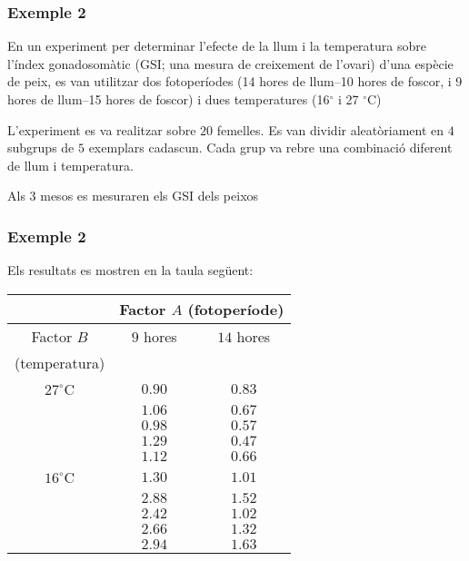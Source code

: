 \documentclass[12pt,t]{beamer}
\theoremstyle{plain}
\theoremstyle{definition}
\begin{document}
\begin{frame}
\frametitle{Exemple 2}

En un experiment per determinar l'efecte
de la llum i la temperatura sobre l'índex gonadosomàtic (GSI; una 
mesura de creixement de l'ovari) d'una espècie de peix, es van utilitzar dos fotoperíodes (14
hores de llum--10 hores de foscor, i 9 hores de llum--15 hores de
foscor) i dues  temperatures (16${}^\circ$ i 27 ${}^\circ$C)
\bigskip
 
L'experiment es va realitzar sobre $20$ femelles. Es van dividir
aleatòriament en $4$ subgrups de  $5$ exemplars cadascun. Cada grup va rebre una combinació diferent de llum i temperatura.
\bigskip

Als 3 mesos es mesuraren els GSI dels peixos

\end{frame}

\begin{frame}
\frametitle{Exemple 2}

Els resultats es mostren en
la taula següent:


\begin{center}
\begin{tabular}{ccc}
\hline
&\multicolumn{2}{c}{Factor $A$ (fotoperíode)}\\\hline
Factor $B$&$9$ hores&$14$ hores\\
(temperatura)&&\\\hline
$27^\circ$C&$0.90$&$0.83$\\
&$1.06$&$0.67$\\
&$0.98$&$0.57$\\
&$1.29$&$0.47$\\
&$1.12$&$0.66$\\\hline
$16^\circ$C&$1.30$&$1.01$\\
&$2.88$&$1.52$\\
&$2.42$&$1.02$\\
&$2.66$&$1.32$\\
&$2.94$&$1.63$\\\hline
\end{tabular}
\end{center}
\end{frame}
\end{document}
